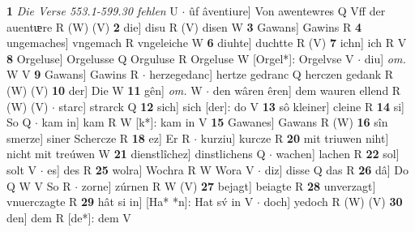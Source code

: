\documentclass[8pt,a4paper,notitlepage]{article}
\begin{document}
\begin{table}[ht]
\begin{minipage}[t]{0.5\linewidth}
\textbf{1} \textit{Die Verse 553.1-599.30 fehlen} U   $\cdot$ ûf âventiure] Von awentewres Q Vff der auentᵫre R (W) (V) \textbf{2} die] disu R (V) disen W \textbf{3} Gawans] Gawins R \textbf{4} ungemaches] vngemach R vngeleiche W \textbf{6} diuhte] duchtte R (V) \textbf{7} ichn] ich R V \textbf{8} Orgeluse] Orgelusse Q Orguluse R Orgeluse W [Orgel*]: Orgelvse V  $\cdot$ diu] \textit{om.} W V \textbf{9} Gawans] Gawins R  $\cdot$ herzegedanc] hertze gedranc Q herczen gedank R (W) (V) \textbf{10} der] Die W \textbf{11} gên] \textit{om.} W  $\cdot$ den wâren êren] dem wauren ellend R (W) (V)  $\cdot$ starc] strarck Q \textbf{12} sich] sich [der]: do V \textbf{13} sô kleiner] cleine R \textbf{14} si] So Q  $\cdot$ kam in] kam R W [k*]: kam in V \textbf{15} Gawanes] Gawans R (W) \textbf{16} sîn smerze] siner Schercze R \textbf{18} ez] Er R  $\cdot$ kurziu] kurcze R \textbf{20} mit triuwen niht] nicht mit treúwen W \textbf{21} dienstlîchez] dinstlichens Q  $\cdot$ wachen] lachen R \textbf{22} sol] solt V  $\cdot$ es] des R \textbf{25} wolra] Wochra R W Wora V  $\cdot$ diz] disse Q das R \textbf{26} dâ] Do Q W V So R  $\cdot$ zorne] zúrnen R W (V) \textbf{27} bejagt] beiagte R \textbf{28} unverzagt] vnuerczagte R \textbf{29} hât si in] [Ha* *n]: Hat sv́ in V  $\cdot$ doch] yedoch R (W) (V) \textbf{30} den] dem R [de*]: dem V \newline
\end{minipage}
\end{table}
\end{document}
